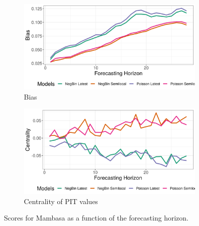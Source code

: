 \begin{figure}[H]
\begin{subfigure}{0.5\textwidth}
  \centering
  \includegraphics[width=\linewidth]{../output/Mambasa_bias.png}  
  \caption{Bias}
  \label{fig:Mambasa_scores_3}
\end{subfigure}
\begin{subfigure}{0.5\textwidth}
  \centering
  \includegraphics[width=\linewidth]{../output/Mambasa_centrality.png}  
  \caption{Centrality of PIT values}
  \label{fig:Mambasa_scores_4}
\end{subfigure}
  \caption{Scores for Mambasa as a function of the forecasting horizon.}

  \label{fig:nat_scores}
\end{figure}
